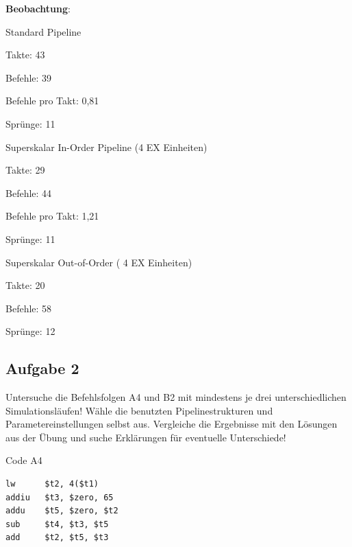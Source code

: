 \documentclass[a4paper,12pt,titlepage]{scrartcl}
\begin{document}
\textbf{Beobachtung}:
\begin{itemize*}
    \item Standard Pipeline
    \begin{itemize*}
        \item Takte: 43
        \item Befehle: 39
        \item Befehle pro Takt: 0,81
        \item Sprünge: 11
    \end{itemize*}
    \item Superskalar In-Order Pipeline (4 EX Einheiten)
    \begin{itemize*}
        \item Takte: 29
        \item Befehle: 44
        \item Befehle pro Takt: 1,21
        \item Sprünge: 11
    \end{itemize*}
    \item Superskalar Out-of-Order ( 4 EX Einheiten)
    \begin{itemize*}
        \item Takte: 20
        \item Befehle: 58
        \item Sprünge: 12
    \end{itemize*}
\end{itemize*}

\subsection*{Aufgabe 2}
Untersuche die Befehlsfolgen A4 und B2 mit mindestens je drei unterschiedlichen Simulationsläufen! Wähle die benutzten Pipelinestrukturen und Parametereinstellungen selbst aus. Vergleiche die Ergebnisse mit den Lösungen aus der Übung und suche Erklärungen für eventuelle Unterschiede!

Code A4
\begin{lstlisting}[basicstyle=\tiny]
lw      $t2, 4($t1)
addiu   $t3, $zero, 65
addu    $t5, $zero, $t2
sub     $t4, $t3, $t5
add     $t2, $t5, $t3
\end{lstlisting}
\end{document}
